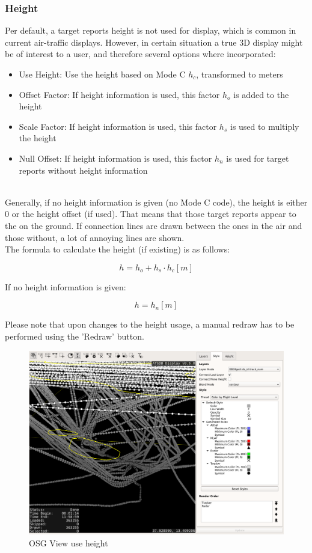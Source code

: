 \subsubsection{Height}
\label{sec:others_height}

Per default, a target reports height is not used for display, which is common in current air-traffic displays. However, in certain situation a true 3D display might be of interest to a user, and therefore several options where incorporated:

\begin{itemize}
 \item Use Height: Use the height based on Mode C $h_c$, transformed to meters
 \item Offset Factor: If height information is used, this factor $h_o$ is added to the height
 \item Scale Factor: If height information is used, this factor $h_s$ is used to multiply the height
 \item Null Offset: If height information is used, this factor $h_n$ is used for target reports without height information
\end{itemize}
\ \\

Generally, if no height information is given (no Mode C code), the height is either $0$ or the height offset (if used). That means that those target reports appear to the on the ground. If connection lines are drawn between the ones in the air and those without, a lot of annoying lines are shown. \\

The formula to calculate the height (if existing) is as follows: 

$$ h = h_o + h_s \cdot h_c [m]$$ 

If no height information is given:

$$ h = h_n [m]$$ 

Please note that upon changes to the height usage, a manual redraw has to be performed using the 'Redraw' button.


\begin{figure}[H]
    \hspace*{-2.5cm}
    \includegraphics[width=19cm,frame]{../screenshots/osgview_use_height.png}
  \caption{OSG View use height}
\end{figure} 

